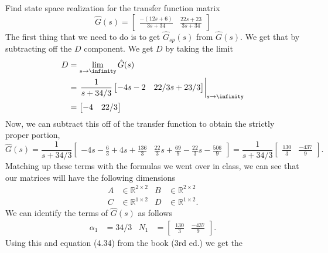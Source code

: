\documentclass[10pt]{article}
\begin{document}
Find state space realization for the transfer function matrix
\begin{equation}
  \hat{G}(s) =
  \begin{bmatrix}
    \frac{-(12s+6)}{3s+34} & \frac{22s+23}{3s+34}
  \end{bmatrix}
\end{equation}
The first thing that we need to do is to get $\hat{G}_{sp}(s)$ from
$\hat{G}(s)$. We get that by subtracting off the $D$ component.  We
get $D$ by taking the limit
\begin{equation}
\begin{split}
  D &= \lim_{s\rightarrow \infinity} \hat{G}(s) \\
  &= \left.\frac{1}{s + 34/3}
  \begin{bmatrix}
    -4s -2 & 22/3 s + 23/3
  \end{bmatrix}\right|_{s\rightarrow\infinity}\\
  & =
  \begin{bmatrix}
    -4 & 22/3
  \end{bmatrix}
\end{split}
\end{equation}
Now, we can subtract this off of the transfer function to obtain the
strictly proper portion,
\begin{equation}
  \hat{G}(s) =\frac{1}{s + 34/3}
  \begin{bmatrix}
    -4s -\frac{6}{3} + 4s + \frac{136}{3} & \frac{22}{3}s +
    \frac{69}{9} - \frac{22}{3}s - \frac{506}{9}
  \end{bmatrix}
   = \frac{1}{s+34/3}
  \begin{bmatrix}
    \frac{130}{3} & \frac{-437}{9}
  \end{bmatrix}.
\end{equation}
Matching up these terms with the formulas we went over in class, we
can see that our matrices will have the following dimensions
\begin{align}
  A&\in \mathbb{R}^{2\times 2} & B &\in \mathbb{R}^{2\times 2} \\
  C&\in \mathbb{R}^{1\times 2} & D &\in \mathbb{R}^{1\times 2}.
\end{align}
We can identify the terms of $\hat{G}(s)$ as follows
\begin{align}
  \alpha_1 &= 34/3 & N_1 &=
  \begin{bmatrix}
    \frac{130}{3} & \frac{-437}{9}
  \end{bmatrix}.
\end{align}
Using this and equation (4.34) from the book (3rd ed.) we get the
\end{document}
